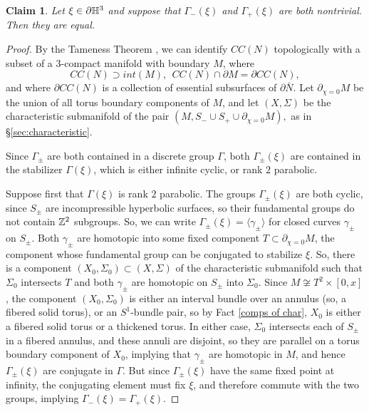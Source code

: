 \documentclass[12pt]{amsart}
\newtheorem{claim}[theorem]{Claim}
\theoremstyle{definition}
\theoremstyle{remark}
\begin{document}
\begin{claim}\label{bothnontrivial}
	Let $\xi \in \partial \mathbb H^3$ and suppose that $\Gamma_-(\xi) $ and $\Gamma_+(\xi)$ are both nontrivial. Then they are equal.
\end{claim}
\begin{proof}
 By the Tameness Theorem \cite{Agoltameness,Calegarishrinkwrapping}, we can identify $CC(N)$ topologically with a subset of a $3$-compact manifold with boundary $M$, where \begin{equation}
CC(N) \supset int(M), \ \ CC(N) \cap \partial M= \partial CC(N), \label{boundeq}
\end{equation} and where $\partial CC(N)$ is a collection of essential subsurfaces of $\partial \bar N$. Let $\partial_{\chi=0} M$ be the union of all torus boundary components of $M$, and let $(X,\Sigma)$ be the characteristic submanifold of the pair $(M,S_-\cup S_+ \cup \partial_{\chi=0} M),$ as in \S \ref{sec:characteristic}. 
	
Since $\Gamma_\pm$ are both contained in a discrete group $\Gamma$, both $\Gamma_\pm(\xi)$ are contained in the stabilizer $\Gamma(\xi)$, which is either infinite cyclic, or rank $2$  parabolic.

Suppose first that $\Gamma(\xi)$ is rank $2$ parabolic. The groups $\Gamma_\pm(\xi)$ are both cyclic, since $S_\pm$ are incompressible hyperbolic surfaces, so their fundamental groups do not contain $\mathbb Z^2$ subgroups. So, we can write $\Gamma_\pm(\xi)=\langle \gamma_\pm \rangle$ for closed curves $\gamma_\pm$ on $S_\pm$.  Both $\gamma_\pm$ are homotopic into some fixed component $T \subset \partial_{\chi=0} M$, the component whose fundamental group can be conjugated to stabilize $\xi$. So, there is a component $(X_0,\Sigma_0) \subset (X,\Sigma)$ of the characteristic submanifold such that $\Sigma_0$ intersects $T$ and both $\gamma_\pm$ are homotopic on $S_\pm$ into $\Sigma_0$. Since $M \not \cong T^2 \times [0,x]$, the component $(X_0,\Sigma_0)$ is either an interval bundle over an annulus (so, a fibered solid torus), or an $S^1$-bundle pair, so by Fact \ref{comps of char}, $X_0$ is either a fibered solid torus or a thickened torus. In either case, $\Sigma_0 $ intersects each of $S_\pm$ in a fibered annulus, and these annuli are disjoint, so they are parallel on a torus boundary component of $X_0$, implying that $\gamma_\pm$ are homotopic in $M$, and hence $\Gamma_\pm(\xi)$ are conjugate in $\Gamma$. But since $\Gamma_\pm(\xi)$ have the same fixed point at infinity, the conjugating element must fix $\xi$, and therefore commute with the two groups, implying $\Gamma_-(\xi)=\Gamma_+(\xi)$.



\end{proof}
\end{document}
